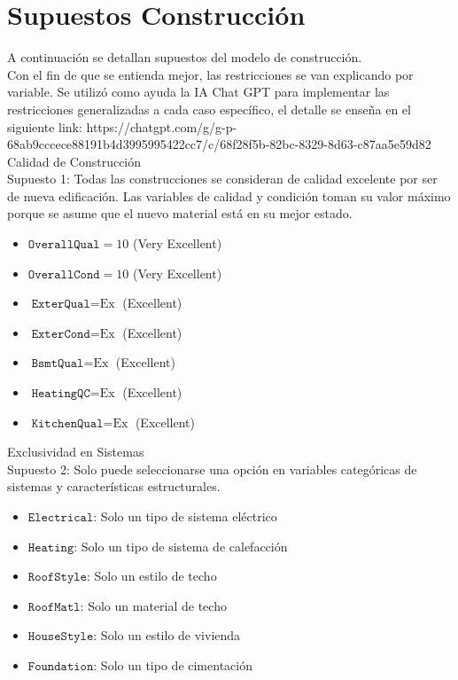 \section{Supuestos Construcción}
\label{sec:supuestos construcción}
A continuación se detallan supuestos del modelo de construcción.\\
Con el fin de que se entienda mejor, las restricciones se van explicando por variable. Se utilizó como ayuda la IA Chat GPT para implementar las restricciones generalizadas a cada caso específico, el detalle se enseña en el siguiente link: https://chatgpt.com/g/g-p-68ab9cccece88191b4d3995995422cc7/c/68f28f5b-82bc-8329-8d63-c87aa5e59d82
{Calidad de Construcción}\\
{Supuesto 1:} Todas las construcciones se consideran de calidad excelente por ser de nueva edificación. Las variables de calidad y condición toman su valor máximo porque se asume que el nuevo material está en su mejor estado.
\begin{itemize}
    \item $\texttt{OverallQual} = 10$ (Very Excellent)
    \item $\texttt{OverallCond} = 10$ (Very Excellent)
    \item $\texttt{ExterQual} = \text{Ex}$ (Excellent)
    \item $\texttt{ExterCond} = \text{Ex}$ (Excellent)
    \item $\texttt{BsmtQual} = \text{Ex}$ (Excellent)
    \item $\texttt{HeatingQC} = \text{Ex}$ (Excellent)
    \item $\texttt{KitchenQual} = \text{Ex}$ (Excellent)
\end{itemize}

{Exclusividad en Sistemas}\\
{Supuesto 2:} Solo puede seleccionarse una opción en variables categóricas de sistemas y características estructurales.
\begin{itemize}
    \item $\texttt{Electrical}$: Solo un tipo de sistema eléctrico
    \item $\texttt{Heating}$: Solo un tipo de sistema de calefacción
    \item $\texttt{RoofStyle}$: Solo un estilo de techo
    \item $\texttt{RoofMatl}$: Solo un material de techo
    \item $\texttt{HouseStyle}$: Solo un estilo de vivienda
    \item $\texttt{Foundation}$: Solo un tipo de cimentación
\end{itemize}

